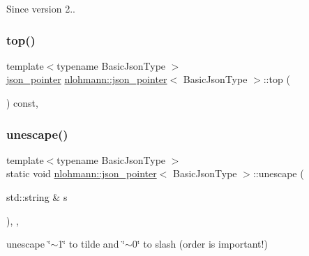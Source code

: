 \begin{DoxySince}{Since}
version 2.. 
\end{DoxySince}
\mbox{\label{classnlohmann_1_1json__pointer_a00eff109d9a0091e42ada9b16b90c8d9}} 
\subsubsection{\texorpdfstring{top()}{top()}}
{\footnotesize\ttfamily template$<$typename Basic\+Json\+Type $>$ \\
\hyperlink{classnlohmann_1_1json__pointer}{json\+\_\+pointer} \hyperlink{classnlohmann_1_1json__pointer}{nlohmann\+::json\+\_\+pointer}$<$ Basic\+Json\+Type $>$\+::top (\begin{DoxyParamCaption}{ }\end{DoxyParamCaption}) const\hspace{0.3cm}{\ttfamily [inline]}, {\ttfamily [private]}}

\mbox{\label{classnlohmann_1_1json__pointer_ab85442d5fbcc289b79beeefc2175446f}} 
\subsubsection{\texorpdfstring{unescape()}{unescape()}}
{\footnotesize\ttfamily template$<$typename Basic\+Json\+Type $>$ \\
static void \hyperlink{classnlohmann_1_1json__pointer}{nlohmann\+::json\+\_\+pointer}$<$ Basic\+Json\+Type $>$\+::unescape (\begin{DoxyParamCaption}\item[{std\+::string \&}]{s }\end{DoxyParamCaption})\hspace{0.3cm}{\ttfamily [inline]}, {\ttfamily [static]}, {\ttfamily [private]}}



unescape \char`\"{}$\sim$1\char`\"{} to tilde and \char`\"{}$\sim$0\char`\"{} to slash (order is important!) 

\mbox{\label{classnlohmann_1_1json__pointer_a920065221e3c81676c3211c100d024a7}} 
